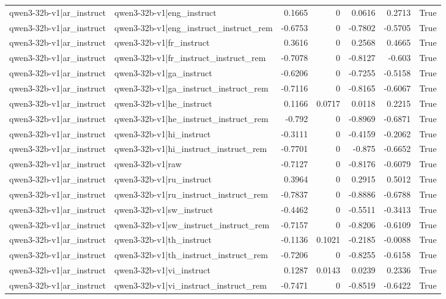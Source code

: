 \begin{table}
\begin{tabular}{l l r r r r l}
qwen3-32b-v1|ar_instruct & qwen3-32b-v1|eng_instruct & 0.1665 & 0 & 0.0616 & 0.2713 & True \\
qwen3-32b-v1|ar_instruct & qwen3-32b-v1|eng_instruct_instruct_rem & -0.6753 & 0 & -0.7802 & -0.5705 & True \\
qwen3-32b-v1|ar_instruct & qwen3-32b-v1|fr_instruct & 0.3616 & 0 & 0.2568 & 0.4665 & True \\
qwen3-32b-v1|ar_instruct & qwen3-32b-v1|fr_instruct_instruct_rem & -0.7078 & 0 & -0.8127 & -0.603 & True \\
qwen3-32b-v1|ar_instruct & qwen3-32b-v1|ga_instruct & -0.6206 & 0 & -0.7255 & -0.5158 & True \\
qwen3-32b-v1|ar_instruct & qwen3-32b-v1|ga_instruct_instruct_rem & -0.7116 & 0 & -0.8165 & -0.6067 & True \\
qwen3-32b-v1|ar_instruct & qwen3-32b-v1|he_instruct & 0.1166 & 0.0717 & 0.0118 & 0.2215 & True \\
qwen3-32b-v1|ar_instruct & qwen3-32b-v1|he_instruct_instruct_rem & -0.792 & 0 & -0.8969 & -0.6871 & True \\
qwen3-32b-v1|ar_instruct & qwen3-32b-v1|hi_instruct & -0.3111 & 0 & -0.4159 & -0.2062 & True \\
qwen3-32b-v1|ar_instruct & qwen3-32b-v1|hi_instruct_instruct_rem & -0.7701 & 0 & -0.875 & -0.6652 & True \\
qwen3-32b-v1|ar_instruct & qwen3-32b-v1|raw & -0.7127 & 0 & -0.8176 & -0.6079 & True \\
qwen3-32b-v1|ar_instruct & qwen3-32b-v1|ru_instruct & 0.3964 & 0 & 0.2915 & 0.5012 & True \\
qwen3-32b-v1|ar_instruct & qwen3-32b-v1|ru_instruct_instruct_rem & -0.7837 & 0 & -0.8886 & -0.6788 & True \\
qwen3-32b-v1|ar_instruct & qwen3-32b-v1|sw_instruct & -0.4462 & 0 & -0.5511 & -0.3413 & True \\
qwen3-32b-v1|ar_instruct & qwen3-32b-v1|sw_instruct_instruct_rem & -0.7157 & 0 & -0.8206 & -0.6109 & True \\
qwen3-32b-v1|ar_instruct & qwen3-32b-v1|th_instruct & -0.1136 & 0.1021 & -0.2185 & -0.0088 & True \\
qwen3-32b-v1|ar_instruct & qwen3-32b-v1|th_instruct_instruct_rem & -0.7206 & 0 & -0.8255 & -0.6158 & True \\
qwen3-32b-v1|ar_instruct & qwen3-32b-v1|vi_instruct & 0.1287 & 0.0143 & 0.0239 & 0.2336 & True \\
qwen3-32b-v1|ar_instruct & qwen3-32b-v1|vi_instruct_instruct_rem & -0.7471 & 0 & -0.8519 & -0.6422 & True \\

\end{tabular}
\end{table}

